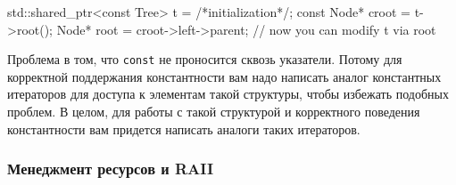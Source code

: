 \begin{enumerate}
\begin{cppcode}
std::shared_ptr<const Tree> t = /*initialization*/;
const Node* croot = t->root();
Node* root = croot->left->parent;
// now you can modify t via root
\end{cppcode}
Проблема в том, что \verb"const" не проносится сквозь указатели.
Потому для корректной поддержания константности вам надо написать аналог константных итераторов для доступа к элементам такой структуры, чтобы избежать подобных проблем.
В целом, для работы с такой структурой и корректного поведения константности вам придется написать аналоги таких итераторов.
\end{enumerate}

\subsubsection{Менеджмент ресурсов и RAII}
\label{section::RAII}

